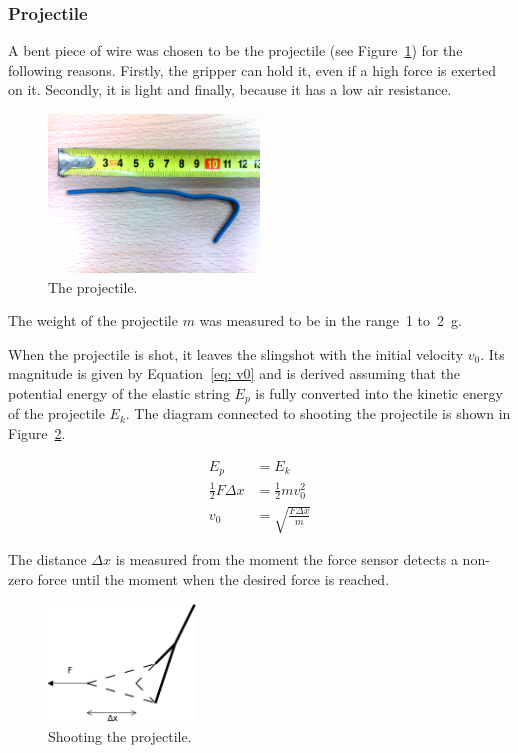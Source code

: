 	
		\subsubsection{Projectile}
			A bent piece of wire was chosen to be the projectile (see Figure~\ref{fig: projectile}) for the following reasons. Firstly, the gripper can hold it, even if a high force is exerted on it. Secondly, it is light and finally, because it has a low air resistance.

			\begin{figure}[h]
			\includegraphics[width=0.5\textwidth]{bulletAdj.png}			
			\centering
			\caption{The projectile.}
			\label{fig: projectile}
			\end{figure}
			
			The weight of the projectile $m$ was measured to be in the range~1 to~\SI{2}{g}.
			
			When the projectile is shot, it leaves the slingshot with the initial velocity $ v_0$. Its magnitude is given by Equation~\eqref{eq: v0} and is derived assuming that the potential energy of the elastic string $ E_p$ is fully converted into the kinetic energy of the projectile $ E_k$. The diagram connected to shooting the projectile is shown in Figure~\ref{fig: shooting projectile}.
			
\begin{align}
E_p & = E_k \\[1ex]
%
\frac{1}{2}F \Delta x & = \frac{1}{2} m v_0^2 \nonumber \\[1ex]
%
v_0 & = \sqrt{\frac{F \Delta x}{m}} 
\label{eq: v0}
\end{align}	
			
			The distance $ \Delta x$ is measured from the moment the force sensor detects a non-zero force until the moment when the desired force is reached.
			
			\begin{figure}
			\includegraphics[width=0.35\textwidth]{force.png}			
			\centering
			\caption{Shooting the projectile.}
			\label{fig: shooting projectile}
			\end{figure}

